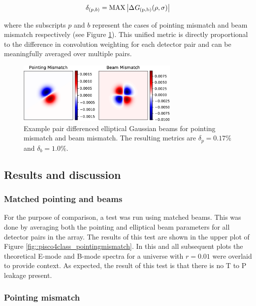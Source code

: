 \documentclass[a4paper,11pt]{article}
\begin{document}
\begin{equation}
\delta_{(p,b)} = \rm{MAX}\left| \Delta \textsl{G}_{(p,b)}(\rho,\sigma) \right|
\end{equation}

\noindent
where the subscripts $p$ and $b$ represent the cases of pointing mismatch and beam mismatch respectively (see Figure \ref{fig::mismatch_metric}). This unified metric is directly proportional to the difference in convolution weighting for each detector pair and can be meaningfully averaged over multiple pairs. 

\begin{figure}
	\centering
	\includegraphics[width=0.7\textwidth]{figures/PairDiffSinglePair-crop.pdf}
	\caption{Example pair differenced elliptical Gaussian beams for pointing mismatch and beam mismatch. The resulting metrics are $\delta_p = 0.17\%$ and $\delta_b = 1.0\%$.}
	\label{fig::mismatch_metric}
\end{figure}

\subsection{Results and discussion}

\subsubsection{Matched pointing and beams}

For the purpose of comparison, a test was run using matched beams. This was done by averaging both the pointing and elliptical beam parameters for all detector pairs in the array. The results of this test are shown in the upper plot of Figure \ref{fig::pisco4class_pointingmismatch}. In this and all subsequent plots the theoretical E-mode and B-mode spectra for a universe with $r=0.01$ were overlaid to provide context. As expected, the result of this test is that there is no T to P leakage present.   


\subsubsection{Pointing mismatch}
\end{document}
